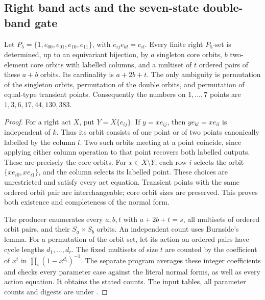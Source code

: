 \subsection{Right band acts and the seven-state double-band gate}
\begin{lemma}
\label{CP2:A-P5-normal-forms}
Let $P_5=\{1,e_{00},e_{01},e_{10},e_{11}\}$, with
$e_{ij}e_{kl}=e_{il}$. Every finite right $P_5$-set is determined,
up to an equivariant bijection, by $a$ singleton core orbits,
$b$ two-element core orbits with labelled columns, and a multiset
of $t$ ordered pairs of these $a+b$ orbits. Its cardinality is
$a+2b+t$. The only ambiguity is permutation of the singleton
orbits, permutation of the double orbits, and permutation of
equal-type transient points. Consequently the numbers on
$1,\ldots,7$ points are $1,3,6,17,44,130,383$.
\end{lemma}
\begin{proof}
For a right act $X$, put $Y=X\{e_{ij}\}$. If $y=xe_{ij}$,
then $ye_{kl}=xe_{il}$ is independent of $k$. Thus its orbit
consists of one point or of two points canonically labelled
by the column $l$. Two such orbits meeting at a point coincide,
since applying either column operation to that point recovers
both labelled outputs. These are precisely the core orbits.
For $x\in X\setminus Y$, each row $i$ selects the orbit
$\{xe_{i0},xe_{i1}\}$, and the column selects its labelled
point. These choices are unrestricted and satisfy every act
equation. Transient points with the same ordered orbit pair
are interchangeable; core orbit sizes are preserved. This
proves both existence and completeness of the normal form.

The producer  enumerates every
$a,b,t$ with $a+2b+t=s$, all multisets of ordered orbit pairs,
and their $S_a\times S_b$ orbits. An independent count uses
Burnside's lemma. For a permutation of the orbit set, let its
action on ordered pairs have cycle lengths $d_1,\ldots,d_r$.
The fixed multisets of size $t$ are counted by the coefficient
of $x^t$ in $\prod_i(1-x^{d_i})^{-1}$. The separate program
 averages these
integer coefficients and checks every parameter case against
the literal normal forms, as well as every action equation.
It obtains the stated counts. The input tables, all parameter
counts and digests are under .
\end{proof}


